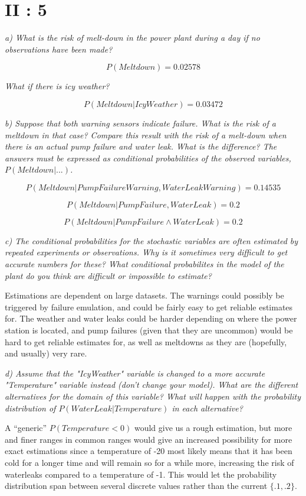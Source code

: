 \section{II : 5}
\em a) What is the risk of melt-down in the power plant during a day if no observations have been made? \em

$$P(Meltdown) = 0.02578$$

\em What if there is icy weather?\em

$$P(Meltdown|IcyWeather) = 0.03472$$

\em b) Suppose that both warning sensors indicate failure. What is the risk of a meltdown in that case? Compare this result with the risk of a melt-down when there is an actual pump failure and water leak. What is the difference? The answers must be expressed as conditional probabilities of the observed variables, $P(Meltdown|...)$.\em

$$P(Meltdown|PumpFailureWarning,WaterLeakWarning) = 0.14535$$

$$P(Meltdown|PumpFailure,WaterLeak) = 0.2$$

$$P(Meltdown|PumpFailure \land WaterLeak) = 0.2$$

\em c) The conditional probabilities for the stochastic variables are often estimated by repeated experiments or observations. Why is it sometimes very difficult to get accurate numbers for these? What conditional probabilites in the model of the plant do you think are difficult or impossible to estimate?\em

Estimations are dependent on large datasets. The warnings could possibly be triggered by failure emulation, and could be fairly easy to get reliable estimates for. The weather and water leaks could be harder depending on where the power station is located, and pump failures (given that they are uncommon) would be hard to get reliable estimates for, as well as meltdowns as they are (hopefully, and usually) very rare.

\em d) Assume that the "IcyWeather" variable is changed to a more accurate "Temperature" variable instead (don't change your model). What are the different alternatives for the domain of this variable? What will happen with the probability distribution of $P(WaterLeak|Temperature)$ in each alternative? \em

A ``generic'' $P(Temperature < 0)$ would give us a rough estimation, but more and finer ranges in common ranges would give an increased possibility for more exact estimations since a temperature of -20 most likely means that it has been cold for a longer time and will remain so for a while more, increasing the risk of waterleaks compared to a temperature of -1. This would let the probability distribution span between several discrete values rather than the current $\{.1,.2\}$.

